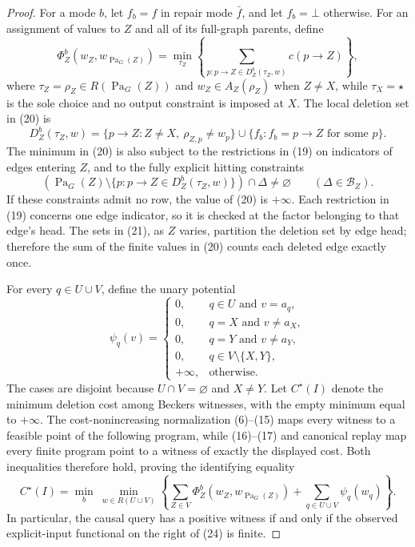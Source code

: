 \documentclass{article}
\begin{document}
\begin{proof}
For a mode \(b\), let \(f_b=f\) in repair mode \(\bar f\), and let \(f_b=\bot\) otherwise.  For an assignment of values to \(Z\) and all of its full-graph parents, define
\[
 \Phi_Z^b(w_Z,w_{\operatorname{Pa}_G(Z)})
 =
 \min_{\tau_Z}
 \left\{
  \sum_{p:p\to Z\in D_Z^b(\tau_Z,w)}c(p\to Z)
 \right\},                                                            \tag{20}
\]
where \(\tau_Z=\rho_Z\in R(\operatorname{Pa}_G(Z))\) and \(w_Z\in A_Z(\rho_Z)\) when \(Z\ne X\), while \(\tau_X=\star\) is the sole choice and no output constraint is imposed at \(X\).  The local deletion set in (20) is
\[
 D_Z^b(\tau_Z,w)
 =\{p\to Z:Z\ne X,\ \rho_{Z,p}\ne w_p\}
  \cup\{f_b:f_b=p\to Z\text{ for some \(p\)}\}.                     \tag{21}
\]
The minimum in (20) is also subject to the restrictions in (19) on indicators of edges entering \(Z\), and to the fully explicit hitting constraints
\[
 \left(\operatorname{Pa}_G(Z)
 \setminus\{p:p\to Z\in D_Z^b(\tau_Z,w)\}\right)
 \cap\Delta\ne\varnothing
 \qquad(\Delta\in\mathcal B_Z).                                     \tag{22}
\]
If these constraints admit no row, the value of (20) is \(+\infty\).  Each restriction in (19) concerns one edge indicator, so it is checked at the factor belonging to that edge's head.  The sets in (21), as \(Z\) varies, partition the deletion set by edge head; therefore the sum of the finite values in (20) counts each deleted edge exactly once.

For every \(q\in U\cup V\), define the unary potential
\[
 \psi_q(v)=
 \begin{cases}
  0,&q\in U\text{ and }v=a_q,\\
  0,&q=X\text{ and }v\ne a_X,\\
  0,&q=Y\text{ and }v\ne a_Y,\\
  0,&q\in V\setminus\{X,Y\},\\
  +\infty,&\text{otherwise}.
 \end{cases}                                                          \tag{23}
\]
The cases are disjoint because \(U\cap V=\varnothing\) and \(X\ne Y\).  Let \(C^\star(I)\) denote the minimum deletion cost among Beckers witnesses, with the empty minimum equal to \(+\infty\).  The cost-nonincreasing normalization (6)--(15) maps every witness to a feasible point of the following program, while (16)--(17) and canonical replay map every finite program point to a witness of exactly the displayed cost.  Both inequalities therefore hold, proving the identifying equality
\[
 C^\star(I)
 =
 \min_b\ \min_{w\in R(U\cup V)}
 \left\{
  \sum_{Z\in V}\Phi_Z^b(w_Z,w_{\operatorname{Pa}_G(Z)})
  +\sum_{q\in U\cup V}\psi_q(w_q)
 \right\}.                                                           \tag{24}
\]
In particular, the causal query has a positive witness if and only if the observed explicit-input functional on the right of (24) is finite.


\end{proof}
\end{document}
